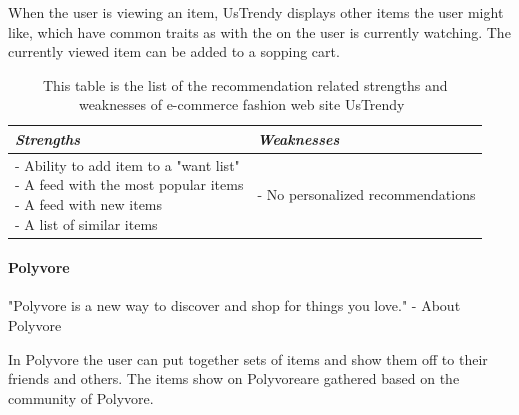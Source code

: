     When the user is viewing an item, UsTrendy displays other items the user might like, which have common traits as with the on the user is currently watching.
    The currently viewed item can be added to a sopping cart.
    \begin{table}[H]
        \centering
        \begin{tabular}{l|l}
            \toprule
            \emph{Strengths} & \emph{Weaknesses} \\ \hline
            \pbox{9cm}{
                - Ability to add item to a "want list" \\
                - A feed with the most popular items \\
                - A feed with new items \\
                - A list of similar items
            } & \pbox{9cm}{
                - No personalized recommendations \\
            } \\ \bottomrule
        \end{tabular}
        \caption[Recommendation related strengths and weaknesses of UsTrendy~\cite{UsTrendy}]{This table is the list of the recommendation related strengths and weaknesses of e-commerce fashion web site UsTrendy~\cite{UsTrendy}}
        \label{table:ecommenreceUsTrendy}
    \end{table}


\paragraph{Polyvore} %
\label{par:polyvore}
    "Polyvore is a new way to discover and shop for things you love." - About Polyvore~\cite{polyvore}

    In Polyvore the user can put together sets of items and show them off to their friends and others.
    The items show on Polyvoreare gathered based on the community of Polyvore.

